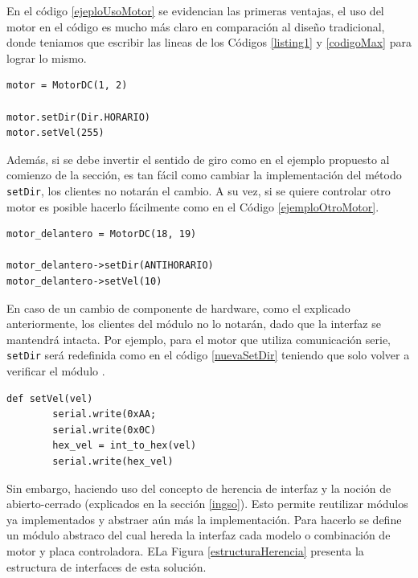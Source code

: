 En el código \ref{ejeploUsoMotor} se evidencian las primeras ventajas, el uso del motor en el código es mucho más claro en comparación al diseño tradicional, donde teniamos que escribir las lineas de los Códigos \ref{listing1} y \ref{codigoMax} para lograr lo mismo.

\begin{lstlisting}[caption=Ejemplo de uso de la interfaz del módulo MotorDC, label={ejeploUsoMotor}]
motor = MotorDC(1, 2)

motor.setDir(Dir.HORARIO)
motor.setVel(255)
\end{lstlisting}

Además, si se debe invertir el sentido de giro como en el ejemplo propuesto al comienzo de la sección, es tan fácil como cambiar la implementación del método \verb|setDir|, los clientes no notarán el cambio. A su vez, si se quiere controlar otro motor es posible hacerlo fácilmente como en el Código \ref{ejemploOtroMotor}. 

\begin{lstlisting}[caption=Ejemplo control nuevo motor DC.,label={ejemploOtroMotor}]
motor_delantero = MotorDC(18, 19)

motor_delantero->setDir(ANTIHORARIO)
motor_delantero->setVel(10)
\end{lstlisting}


En caso de un cambio de componente de hardware, como el explicado anteriormente, los clientes del módulo no lo notarán, dado que la interfaz se mantendrá intacta. Por ejemplo, para el motor que utiliza comunicación serie, \verb|setDir| será redefinida como en el código \ref{nuevaSetDir} teniendo que solo volver a verificar el módulo \MotorDC.

\begin{lstlisting}[caption=Implementación método setVel para el motor que utiliza comunicación serie.,label={nuevaSetDir}]
def setVel(vel)
        serial.write(0xAA;
        serial.write(0x0C)
        hex_vel = int_to_hex(vel)
        serial.write(hex_vel)
\end{lstlisting}

Sin embargo, haciendo uso del concepto de herencia de interfaz y la noción de abierto-cerrado (explicados en la sección \ref{ingso}). Esto permite reutilizar módulos ya implementados y abstraer aún más la implementación. Para hacerlo se define un módulo abstraco \textit{\MotorDC} del cual hereda la interfaz cada modelo o combinación de motor y placa controladora. ELa Figura \ref{estructuraHerencia} presenta la estructura de interfaces de esta solución.

